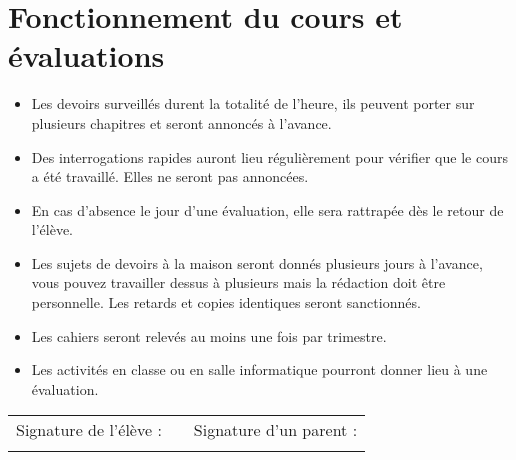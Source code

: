 \documentclass[a4paper, 11pt]{article}
\begin{document}
\section{Fonctionnement du cours et évaluations}

\begin{itemize}
	\item Les devoirs surveillés durent la totalité de l'heure, ils peuvent porter sur plusieurs chapitres et seront annoncés à l'avance.
	
	\item Des interrogations rapides auront lieu régulièrement pour vérifier que le cours a été travaillé. Elles ne seront pas annoncées.
	
	\item En cas d'absence le jour d'une évaluation, elle sera rattrapée dès le retour de l'élève.
	
	\item Les sujets de devoirs à la maison seront donnés plusieurs jours à l'avance, vous pouvez travailler dessus à plusieurs mais la rédaction doit être personnelle. Les retards et copies identiques seront sanctionnés.
	
	\item Les cahiers seront relevés au moins une fois par trimestre.
	
	\item Les activités en classe ou en salle informatique pourront donner lieu à une évaluation.
	
\end{itemize}

\vspace*{0.5cm}
\begin{tabular}{ccr}
	
	Signature de l'élève : & \hspace*{5cm} & Signature d'un parent : \\
	&  &                      
\end{tabular}
	
\end{document}
